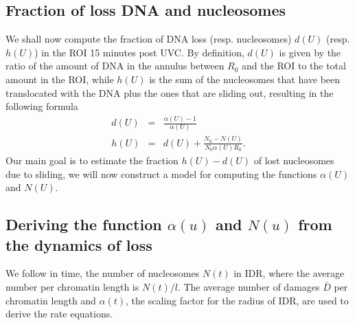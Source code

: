 \documentclass[12pt]{article}
\newcommand{\beq}{\begin{eqnarray}}
\newcommand{\eeq}{\end{eqnarray}}
\begin{document}
\subsection{Fraction of loss DNA and nucleosomes }
We shall now compute the fraction of DNA loss (resp. nucleosomes) $d(U)$ (resp. $h(U)$) in the ROI 15 minutes post UVC. By definition, $d(U)$ is given by the ratio of the amount of DNA in the annulus between $R_0$ and the ROI to the total amount in the ROI, while $h(U)$ is the sum of the nucleosomes that have been translocated with the DNA plus the ones that are sliding out, resulting in the following formula
\beq
d(U)&=& \frac{\alpha(U) -1}{\alpha(U)} \\
h(U)&=&d(U)+\frac{N_0-N(U)}{N_0 \alpha(U) R_0}.
\eeq
Our main goal is to estimate the fraction $h(U)-d(U)$ of lost nucleosomes due to sliding, we will now construct a model for computing the functions $\alpha(U)$ and $N(U)$.
\subsection{Deriving the function $\alpha(u)$ and $N(u)$ from the dynamics of loss}
We follow in time, the number of nucleosomes $N(t)$ in IDR, where the average number per chromatin length is $N(t)/l$. The average number of damages $\bar{D}$ per chromatin length and $\alpha(t)$, the scaling factor for the radius of IDR, are used to derive the rate equations.
\end{document}
